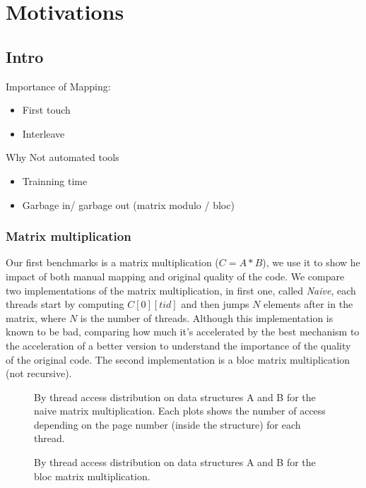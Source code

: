 \section{Motivations}
\label{sec:motivations}

\subsection{Intro}
\label{sec:motivations-intro}

Importance of Mapping:
\begin{itemize}
    \item First touch
    \item Interleave
\end{itemize}

Why Not automated tools
\begin{itemize}
    \item Trainning time
    \item Garbage in/ garbage out (matrix modulo / bloc)
\end{itemize}
\subsubsection{Matrix multiplication}


Our first benchmarks is a matrix multiplication ($C=A*B$), we use it to show he
impact of both manual mapping and original quality of the code. We compare two
implementations of the matrix multiplication, in first one, called
\emph{Naive}, each threads start by computing $C[0][tid]$ and then jumps $N$
elements after in the matrix, where $N$ is the number of threads. Although
this implementation is known to be bad, comparing how much it's accelerated by
the best mechanism to the acceleration of a better version to understand the
importance of the quality of the original code.  The
second implementation is a bloc matrix multiplication (not recursive).

\begin{figure}[htb]
    \centering
    \caption{By thread access distribution on data structures A and B for the
    naive matrix multiplication. Each plots shows the number of access
depending on the page number (inside the structure) for each thread.}
    \label{fig:matrix-naive}
\end{figure}
\begin{figure}[htb]
    \centering
    \caption{By thread access distribution on data structures A and B for the
    bloc matrix multiplication.}
    \label{fig:matrix-bloc}
\end{figure}

